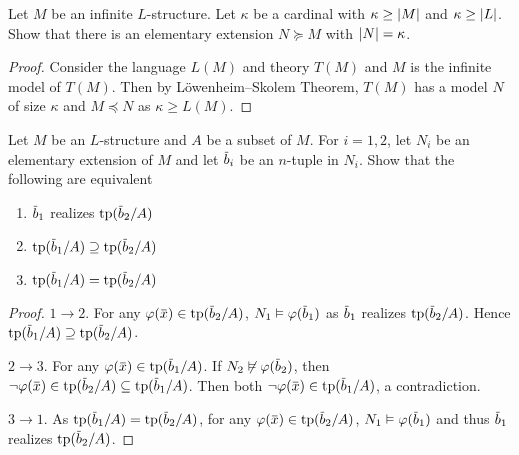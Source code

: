 \documentclass[11pt]{article}
\begin{document}
\begin{exercise}
Let \(M\) be an infinite \(L\)-structure. Let \(\kappa\) be a cardinal with \(\kappa\ge\abs{M}\) and \(\kappa\ge\abs{L}\).
Show that there is an elementary extension \(N\succeq M\) with \(\abs{N}=\kappa\).
\end{exercise}

\begin{proof}
Consider the language \(L(M)\) and theory \(T(M)\) and \(M\) is the infinite model of \(T(M)\). Then
by Löwenheim–Skolem Theorem, \(T(M)\) has a model \(N\) of size \(\kappa\) and \(M\preceq N\) as \(\kappa\ge L(M)\).
\end{proof}

\begin{exercise}
Let \(M\) be an \(L\)-structure and \(A\) be a subset of \(M\). For \(i=1,2\), let \(N_i\) be an
elementary extension of \(M\) and let \(\barb_i\) be an \(n\)-tuple in \(N_i\). Show that the
following are equivalent
\begin{enumerate}
\item \(\barb_1\) realizes \(\tp(\barb_2/A)\)
\item \(\tp(\barb_1/A)\supseteq\tp(\barb_2/A)\)
\item \(\tp(\barb_1/A)=\tp(\barb_2/A)\)
\end{enumerate}
\end{exercise}

\begin{proof}
\(1\to 2\). For any \(\varphi(\barx)\in\tp(\barb_2/A)\), \(N_1\vDash\varphi(\barb_1)\) as \(\barb_1\)
realizes \(\tp(\barb_2/A)\). Hence \(\tp(\barb_1/A)\supseteq\tp(\barb_2/A)\).

\(2\to 3\). For any \(\varphi(\barx)\in\tp(\barb_1/A)\). If \(N_2\not\vDash\varphi(\barb_2)\),
then \(\neg\varphi(\barx)\in\tp(\barb_2/A)\subseteq\tp(\barb_1/A)\). Then both \(\neg\varphi(\barx)\in\tp(\barb_1/A)\), a
contradiction.

\(3\to 1\). As \(\tp(\barb_1/A)=\tp(\barb_2/A)\), for any \(\varphi(\barx)\in\tp(\barb_2/A)\), \(N_1\vDash\varphi(\barb_1)\)
and thus \(\barb_1\) realizes \(\tp(\barb_2/A)\).
\end{proof}
\end{document}
